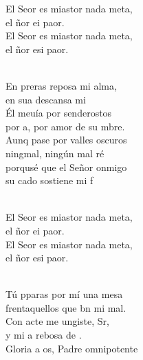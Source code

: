 \begin{cancion}%
	\begin{chorus}%
	El Seor es miastor nada meta,\\
	el ñor ei paor.\\
	El Seor es miastor nada meta,\\
	el ñor esi paor.\\
	\end{chorus}%
	\jump\\
	En preras reposa mi alma,\\
	en sua descansa mi \\
	Él meuía por senderostos\\
	por a, por amor de su mbre.\\
	Aunq pase por valles oscuros\\
	ningmal, ningún mal ré\\
	porqusé que el Señor onmigo\\
	su cado sostiene mi f\\\jump\\
	\begin{chorus}%
	El Seor es miastor nada meta,\\
	el ñor ei paor.\\
	El Seor es miastor nada meta,\\
	el ñor esi paor.\\
	\end{chorus}%
	\jump\\
	Tú pparas por mí una mesa\\
	frentaquellos que bn mi mal.\\
	Con acte me ungiste, Sr,\\
	y mi a rebosa de .\\
	Gloria a os, Padre omnipotente\\

\end{cancion}
